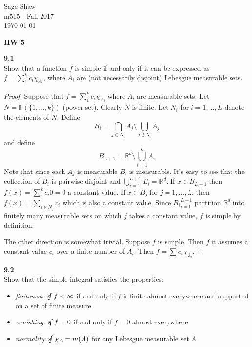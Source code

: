 \documentclass[12pt]{article}
\newcommand{\problem}[1]{\hspace{-4 ex} \large \textbf{#1}\\}
\newcommand{\sint}{\text{s}\kern-5pt\int}
\begin{document}
	\thispagestyle{empty}
	
	\begin{flushright}
		Sage Shaw \\
		m515 - Fall 2017 \\
		\today
	\end{flushright}
	
{\large \textbf{HW 5}}\bigbreak

\problem{9.1} Show that a function $f$ is simple if and only if it can be expressed as $f=\sum_1^kc_i\chi_{A_i}$, where $A_i$ are (not necessarily disjoint) Lebesgue measurable sets.

	\begin{proof}
		Suppose that $f=\sum_1^kc_i\chi_{A_i}$ where $A_i$ are measurable sets.
		Let $N = \mathbb{P}(\{1,...,k\})$ (power set). Clearly $N$ is finite. Let $N_i$ for $i=1,...,L$ denote the elements of $N$. Define
		$$
		B_i = \bigcap_{j \in N_i}A_j \setminus \bigcup_{j \notin N_i}A_j
		$$
		and define
		$$
		B_{L+1} = \mathbb{R}^d \setminus \bigcup_{i=1}^k A_i
		$$
		Note that since each $A_j$ is measurable $B_i$ is measurable. It's easy to see that the collection of $B_i$ is pairwise disjoint and $\bigcup_{i=1}^{L+1} B_i = \mathbb{R}^d$. If $x \in B_{L+1}$ then $f(x)=\sum_1^kc_i 0 = 0$ a constant value. If $x \in B_j$ for $j=1,...,L$, then $f(x) = \sum_{i \in N_j}c_i$ which is also a constant value. Since ${B_i}_{i=1}^{L+1}$ partition $\mathbb{R}^d$ into finitely many measurable sets on which $f$ takes a constant value, $f$ is simple by definition. \bigbreak
		
		The other direction is somewhat trivial. Suppose $f$ is simple. Then $f$ it assumes a constant value $c_i$ over a finite number of $A_i$. Then $f = \sum c_i \chi_{A_i}$.
	\end{proof}

\problem{9.2} Show that the simple integral satisfies the properties:
	\begin{itemize}
		\item \emph{finiteness}: $\sint f<\infty$ if and only if $f$ is finite almost everywhere and supported on a set of finite measure
		\item \emph{vanishing}: $\sint f=0$ if and only if $f=0$ almost everywhere
		\item \emph{normality}: $\sint\chi_A=m(A)$ for any Lebesgue measurable set $A$
	\end{itemize}
\end{document}
